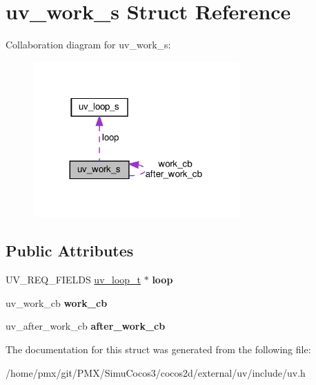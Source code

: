 \hypertarget{structuv__work__s}{}\section{uv\+\_\+work\+\_\+s Struct Reference}
\label{structuv__work__s}


Collaboration diagram for uv\+\_\+work\+\_\+s\+:
\nopagebreak
\begin{figure}[H]
\begin{center}
\leavevmode
\includegraphics[width=224pt]{structuv__work__s__coll__graph}
\end{center}
\end{figure}
\subsection*{Public Attributes}
\begin{DoxyCompactItemize}
\item 
\mbox{\label{structuv__work__s_aaa3833f7dde2ec43f7d240635546eeb4}} 
U\+V\+\_\+\+R\+E\+Q\+\_\+\+F\+I\+E\+L\+DS \hyperlink{structuv__loop__s}{uv\+\_\+loop\+\_\+t} $\ast$ {\bfseries loop}
\item 
\mbox{\label{structuv__work__s_a55d775975b3b6c92a3a21488647e3af0}} 
uv\+\_\+work\+\_\+cb {\bfseries work\+\_\+cb}
\item 
\mbox{\label{structuv__work__s_a0f73c632f0357aaff9fbc1e13fec603c}} 
uv\+\_\+after\+\_\+work\+\_\+cb {\bfseries after\+\_\+work\+\_\+cb}
\end{DoxyCompactItemize}


The documentation for this struct was generated from the following file\+:\begin{DoxyCompactItemize}
\item 
/home/pmx/git/\+P\+M\+X/\+Simu\+Cocos3/cocos2d/external/uv/include/uv.\+h\end{DoxyCompactItemize}
